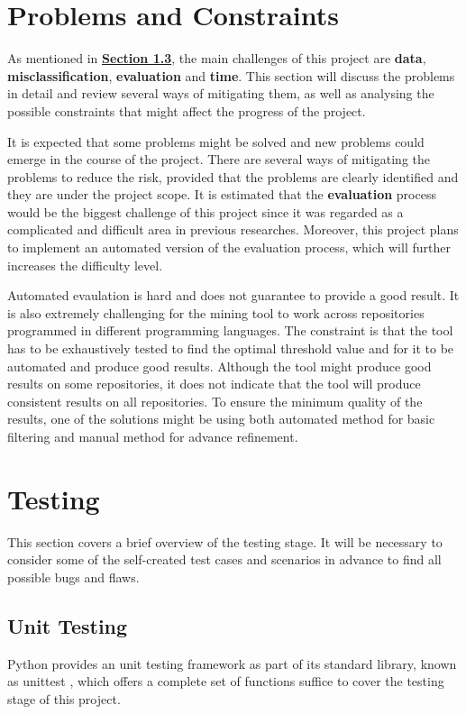 \documentclass[12pt, a4paper]{report}
\begin{document}
{\section{Problems and Constraints}
As mentioned in \hyperref[sec:challenges]{\textbf{Section 1.3}}, the main challenges of this project
are \textbf{data}, \textbf{misclassification}, \textbf{evaluation} and \textbf{time}. This section
will discuss the problems in detail and review several ways of mitigating them, as well as analysing
the possible constraints that might affect the progress of the project.

It is expected that some problems might be solved and new problems could emerge in the course of the
project. There are several ways of mitigating the problems to reduce the risk, provided that the
problems are clearly identified and they are under the project scope. It is estimated that the
\textbf{evaluation} process would be the biggest challenge of this project since it was regarded as
a complicated and difficult area in previous researches. Moreover, this project plans to implement
an automated version of the evaluation process, which will further increases the difficulty level.

Automated evaulation is hard and does not guarantee to provide a good result. It is also extremely
challenging for the mining tool to work across repositories programmed in different programming
languages. The constraint is that the tool has to be exhaustively tested to find the optimal
threshold value and for it to be automated and produce good results. Although the tool might produce
good results on some repositories, it does not indicate that the tool will produce consistent
results on all repositories. To ensure the minimum quality of the results, one of the solutions
might be using both automated method for basic filtering and manual method for advance refinement.

\section{Testing}
This section covers a brief overview of the testing stage. It will be necessary to consider some of
the self-created test cases and scenarios in advance to find all possible bugs and flaws.

\subsection{Unit Testing}
Python provides an unit testing framework as part of its standard library, known as unittest
\cite{unittest}, which offers a complete set of functions suffice to cover the testing stage of this
project.

}
\end{document}
